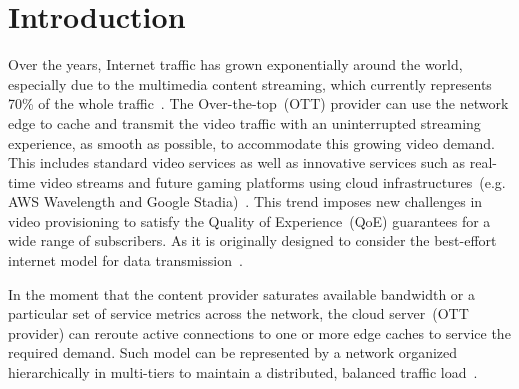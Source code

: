\section{Introduction}
\label{sec:introduction}


Over the years, Internet traffic has grown exponentially around the world, especially due to the multimedia content streaming, which currently represents 70\% of the whole traffic~\cite{cisco:forecast}. 
The Over-the-top~(OTT) provider can use the network edge to cache and transmit the video traffic with an uninterrupted streaming experience, as smooth as possible, to accommodate this growing video demand. This includes standard video services as well as innovative services such as real-time video streams and future gaming platforms using cloud infrastructures~(e.g. AWS Wavelength and Google Stadia)~\cite{amzo:AWSEdge}.
This trend imposes new challenges in video provisioning to satisfy the Quality of Experience~(QoE) guarantees for a wide range of  subscribers. As it is originally designed to consider the best-effort internet model for data transmission~\cite{gamaUCC2019, DBLP:CoRR:2021, ye:ITC17}.

In the moment that the content provider saturates available bandwidth or a particular set of service metrics across the network, the cloud server~(OTT provider) can reroute active connections to one or more edge caches to service the required demand. Such model can be represented by a network organized hierarchically in multi-tiers to maintain a distributed, balanced traffic load~\cite{rosarioSENSORS2018}.

